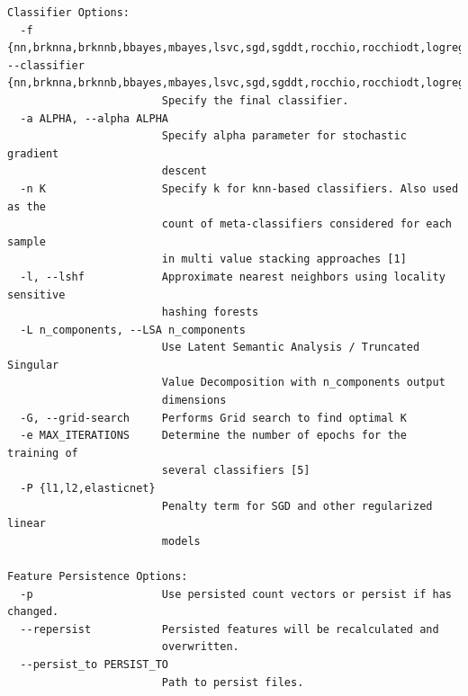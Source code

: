 \documentclass{article}
\begin{document}
\begin{lstlisting}[basicstyle=\ttfamily]
Classifier Options:
  -f {nn,brknna,brknnb,bbayes,mbayes,lsvc,sgd,sgddt,rocchio,rocchiodt,logregress,logregressdt,listnet}, --classifier {nn,brknna,brknnb,bbayes,mbayes,lsvc,sgd,sgddt,rocchio,rocchiodt,logregress,logregressdt,listnet}
                        Specify the final classifier.
  -a ALPHA, --alpha ALPHA
                        Specify alpha parameter for stochastic gradient
                        descent
  -n K                  Specify k for knn-based classifiers. Also used as the
                        count of meta-classifiers considered for each sample
                        in multi value stacking approaches [1]
  -l, --lshf            Approximate nearest neighbors using locality sensitive
                        hashing forests
  -L n_components, --LSA n_components
                        Use Latent Semantic Analysis / Truncated Singular
                        Value Decomposition with n_components output
                        dimensions
  -G, --grid-search     Performs Grid search to find optimal K
  -e MAX_ITERATIONS     Determine the number of epochs for the training of
                        several classifiers [5]
  -P {l1,l2,elasticnet}
                        Penalty term for SGD and other regularized linear
                        models

Feature Persistence Options:
  -p                    Use persisted count vectors or persist if has changed.
  --repersist           Persisted features will be recalculated and
                        overwritten.
  --persist_to PERSIST_TO
                        Path to persist files.
\end{lstlisting}
\end{document}

